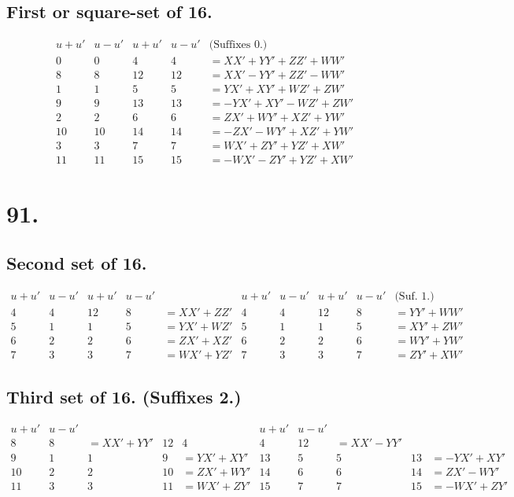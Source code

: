 \documentclass[11pt,a4paper]{article}
\begin{document}
\subsection*{First or square-set of 16.}

\[
\begin{array}{c|cccc}
u+u' & u-u' & u+u' & u-u' & \text{(Suffixes 0.)} \\
\hline
0 & 0 & 4 & 4 & = XX' + YY' + ZZ' + WW' \\
8 & 8 & 12 & 12 & = XX' - YY' + ZZ' - WW' \\
1 & 1 & 5 & 5 & = YX' + XY' + WZ' + ZW' \\
9 & 9 & 13 & 13 & = -YX' + XY' - WZ' + ZW' \\
2 & 2 & 6 & 6 & = ZX' + WY' + XZ' + YW' \\
10 & 10 & 14 & 14 & = -ZX' - WY' + XZ' + YW' \\
3 & 3 & 7 & 7 & = WX' + ZY' + YZ' + XW' \\
11 & 11 & 15 & 15 & = -WX' - ZY' + YZ' + XW'
\end{array}
\]

\newpage
\section*{91.}
\label{sec:91}

\subsection*{Second set of 16.}

\[
\begin{array}{c|cccc|cccc|c}
u+u' & u-u' & u+u' & u-u' & & u+u' & u-u' & u+u' & u-u' & \text{(Suf. 1.)} \\
\hline
4 & 4 & 12 & 8 & = XX' + ZZ' & 4 & 4 & 12 & 8 & = YY' + WW' \\
5 & 1 & 1 & 5 & = YX' + WZ' & 5 & 1 & 1 & 5 & = XY' + ZW' \\
6 & 2 & 2 & 6 & = ZX' + XZ' & 6 & 2 & 2 & 6 & = WY' + YW' \\
7 & 3 & 3 & 7 & = WX' + YZ' & 7 & 3 & 3 & 7 & = ZY' + XW'
\end{array}
\]

\subsection*{Third set of 16. (Suffixes 2.)}

\[
\begin{array}{c|cccc|c|cccc}
u+u' & u-u' & & & & u+u' & u-u' & & & \\
\hline
8 & 8 & = XX' + YY' & 12 & 4 & 4 & 12 & = XX' - YY' \\
9 & 1 & 1 & 9 & = YX' + XY' & 13 & 5 & 5 & 13 & = -YX' + XY' \\
10 & 2 & 2 & 10 & = ZX' + WY' & 14 & 6 & 6 & 14 & = ZX' - WY' \\
11 & 3 & 3 & 11 & = WX' + ZY' & 15 & 7 & 7 & 15 & = -WX' + ZY'
\end{array}
\]
\end{document}
